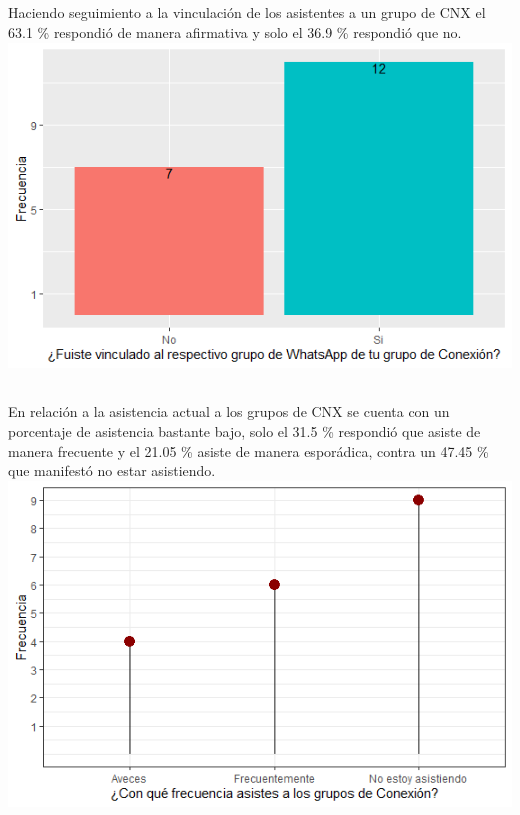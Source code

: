 \documentclass{beamer}
\begin{document}
\subsection{}
\begin{frame}{}
\vspace{-0.9\baselineskip}
\begin{tcolorbox}[colback=backframe_color,colframe=beamer_color,title=] 

Haciendo seguimiento a la vinculación de los asistentes a un grupo de CNX  el 63.1 \% respondió de manera afirmativa y solo el 36.9 \% respondió que no.
\includegraphics[width=0.8\linewidth]{special_figures/Rplot06.png}
\end{tcolorbox}
\end{frame}


\subsection{}
\begin{frame}{}
\vspace{-0.9\baselineskip}
\begin{tcolorbox}[colback=backframe_color,colframe=beamer_color,title=] 

En relación a la asistencia actual a los grupos de CNX se cuenta con un porcentaje de asistencia bastante bajo, solo el 31.5 \% respondió que asiste de manera frecuente y el 21.05 \% asiste de manera esporádica, contra un 47.45 \% que manifestó no estar asistiendo. 
\includegraphics[width=0.7\linewidth]{special_figures/Rplot01_2.png}
\end{tcolorbox}


\end{frame}
\end{document}
